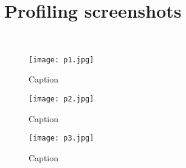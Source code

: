 \documentclass{article}
\begin{document}
\newpage

\section{Profiling screenshots}\\
\begin{figure}
    \centering
    \texttt{[image: p1.jpg]}
    \caption{Caption}
    \label{fig:my_label}
\end{figure}

\begin{figure}
    \centering
    \texttt{[image: p2.jpg]}
    \caption{Caption}
    \label{fig:my_label}
\end{figure}

\begin{figure}
    \centering
    \texttt{[image: p3.jpg]}
    \caption{Caption}
    \label{fig:my_label}
\end{figure}
\newpage
\end{document}
